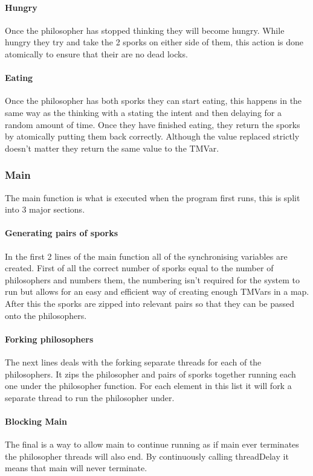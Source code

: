 \documentclass[a4paper]{article}
\begin{document}
\paragraph{Hungry}
Once the philosopher has stopped thinking they will become hungry.
While hungry they try and take the 2 sporks on either side of them, this action is done atomically to ensure that their are no dead locks.

\paragraph{Eating}
Once the philosopher has both sporks they can start eating, this happens in the same way as the thinking with a stating the intent and then delaying for a random amount of time.
Once they have finished eating, they return the sporks by atomically putting them back correctly.
Although the value replaced strictly doesn't matter they return the same value to the TMVar.


\subsubsection{Main}
The main function is what is executed when the program first runs, this is split into 3 major sections.
\paragraph{Generating pairs of sporks}
In the first 2 lines of the main function all of the synchronising variables are created.
First of all the correct number of sporks equal to the number of philosophers and numbers them, the numbering isn't required for the system to run but allows for an easy and efficient way of creating enough TMVars in a map.
After this the sporks are zipped into relevant pairs so that they can be passed onto the philosophers.
\paragraph{Forking philosophers}
The next lines deals with the forking separate threads for each of the philosophers.
It zips the philosopher and pairs of sporks together running each one under the philosopher function.
For each element in this list it will fork a separate thread to run the philosopher under.
\paragraph{Blocking Main}
The final is a way to allow main to continue running as if main ever terminates the philosopher threads will also end.
By continuously calling threadDelay it means that main will never terminate.

\end{document}
